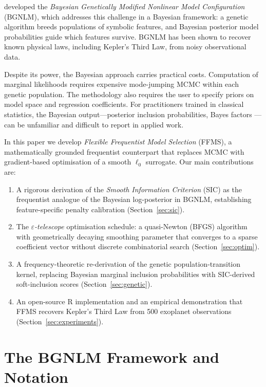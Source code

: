 \documentclass[12pt,a4paper]{article}
\begin{document}
\citet{Hubin2021JAIR} developed the \emph{Bayesian Genetically Modified
Nonlinear Model Configuration} (BGNLM), which addresses this challenge in a
Bayesian framework: a genetic algorithm breeds populations of symbolic features,
and Bayesian posterior model probabilities guide which features survive.  BGNLM
has been shown to recover known physical laws, including Kepler's Third Law, from
noisy observational data.

Despite its power, the Bayesian approach carries practical costs.  Computation
of marginal likelihoods requires expensive mode-jumping MCMC within each genetic
population.  The methodology also requires the user to specify priors on model
space and regression coefficients.  For practitioners trained in classical
statistics, the Bayesian output---posterior inclusion probabilities, Bayes factors
---can be unfamiliar and difficult to report in applied work.

In this paper we develop \emph{Flexible Frequentist Model Selection} (FFMS), a
mathematically grounded frequentist counterpart that replaces MCMC with gradient-based
optimisation of a smooth $\ell_0$ surrogate.  Our main contributions are:

\begin{enumerate}[label=(\roman*)]
  \item A rigorous derivation of the \emph{Smooth Information Criterion} (SIC)
        as the frequentist analogue of the Bayesian log-posterior in BGNLM,
        establishing feature-specific penalty calibration (Section~\ref{sec:sic}).
  \item The \emph{$\varepsilon$-telescope} optimisation schedule: a quasi-Newton
        (BFGS) algorithm with geometrically decaying smoothing parameter that
        converges to a sparse coefficient vector without discrete combinatorial
        search (Section~\ref{sec:optim}).
  \item A frequency-theoretic re-derivation of the genetic population-transition
        kernel, replacing Bayesian marginal inclusion probabilities with SIC-derived
        soft-inclusion scores (Section~\ref{sec:genetic}).
  \item An open-source R implementation and an empirical demonstration that FFMS
        recovers Kepler's Third Law from 500 exoplanet observations
        (Section~\ref{sec:experiments}).
\end{enumerate}

\section{The BGNLM Framework and Notation}
\label{sec:bgnlm}
\end{document}
